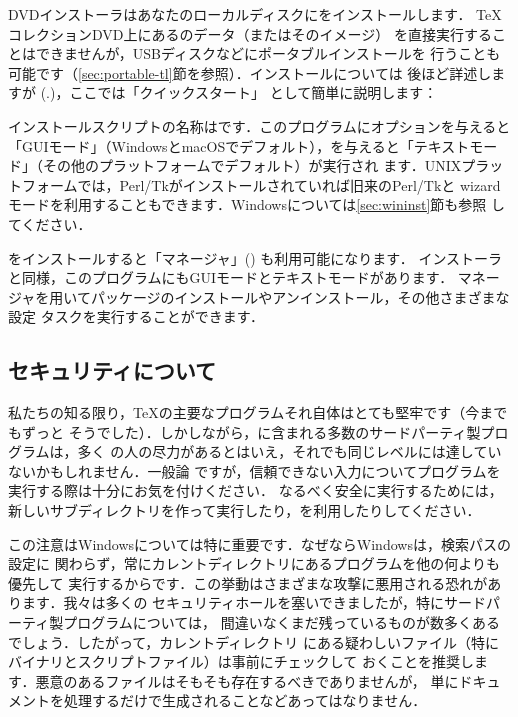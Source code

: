 \documentclass[uplatex,dvipdfmx,tombow]{jsarticle}
\begin{document}
DVDインストーラはあなたのローカルディスクに\TL をインストールします．
\TeX コレクションDVD上にある\TL のデータ（またはそのイメージ）
を直接実行することはできませんが，USBディスクなどにポータブルインストールを
行うことも可能です（\ref{sec:portable-tl}節を参照）．インストールについては
後ほど詳述しますが (\p.\pageref{sec:install})，ここでは「クイックスタート」
として簡単に説明します：

\begin{itemize*}
\item インストールスクリプトの名称はです．このプログラムにオプションを与えると「GUIモード」（WindowsとmacOSでデフォルト），を与えると「テキストモード」（その他のプラットフォームでデフォルト）が実行され
ます．UNIXプラットフォームでは，Perl/Tkがインストールされていれば旧来のPerl/Tkと
wizardモードを利用することもできます．Windowsについては\ref{sec:wininst}節も参照
してください．

\item \TL をインストールすると「\TL マネージャ」() も利用可能になります．
インストーラと同様，このプログラムにもGUIモードとテキストモードがあります．\TL
マネージャを用いてパッケージのインストールやアンインストール，その他さまざまな設定
タスクを実行することができます．
\end{itemize*}

\subsection{セキュリティについて}
\label{sec:security}

私たちの知る限り，\TeX の主要なプログラムそれ自体はとても堅牢です（今までもずっと
そうでした）．しかしながら，\TL に含まれる多数のサードパーティ製プログラムは，多く
の人の尽力があるとはいえ，それでも同じレベルには達していないかもしれません．一般論
ですが，信頼できない入力についてプログラムを実行する際は十分にお気を付けください．
なるべく安全に実行するためには，新しいサブディレクトリを作って実行したり，を利用したりしてください．

この注意はWindowsについては特に重要です．なぜならWindowsは，検索パスの設定に
関わらず，常にカレントディレクトリにあるプログラムを他の何よりも優先して
実行するからです．この挙動はさまざまな攻撃に悪用される恐れがあります．我々は多くの
セキュリティホールを塞いできましたが，特にサードパーティ製プログラムについては，
間違いなくまだ残っているものが数多くあるでしょう．したがって，カレントディレクトリ
にある疑わしいファイル（特にバイナリとスクリプトファイル）は事前にチェックして
おくことを推奨します．悪意のあるファイルはそもそも存在するべきでありませんが，
単にドキュメントを処理するだけで生成されることなどあってはなりません．
\end{document}
